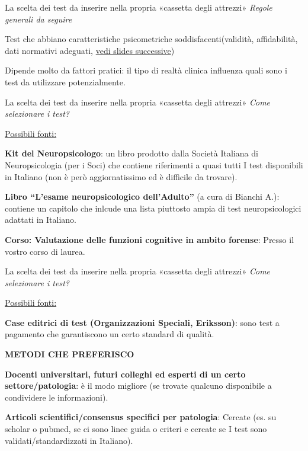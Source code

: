 \documentclass[
  ignorenonframetext,
]{beamer}
\begin{document}
\begin{frame}{La scelta dei test da inserire nella propria «cassetta
degli attrezzi»}
\label{la-scelta-dei-test-da-inserire-nella-propria-cassetta-degli-attrezzi}
\emph{Regole generali da seguire}

Test che abbiano caratteristiche psicometriche soddisfacenti(validità,
affidabilità, dati normativi adeguati,
\underline{vedi slides successive})

Dipende molto da fattori pratici: il tipo di realtà clinica influenza
quali sono i test da utilizzare potenzialmente.
\end{frame}

\begin{frame}{La scelta dei test da inserire nella propria «cassetta
degli attrezzi»}
\label{la-scelta-dei-test-da-inserire-nella-propria-cassetta-degli-attrezzi-1}
\emph{Come selezionare i test?}

\underline{Possibili fonti:}

\textbf{Kit del Neuropsicologo}: un libro prodotto dalla Società
Italiana di Neuropsicologia (per i Soci) che contiene riferimenti a
quasi tutti I test disponibili in Italiano (non è però aggiornatissimo
ed è difficile da trovare).

\textbf{Libro ``L'esame neuropsicologico dell'Adulto''} (a cura di
Bianchi A.): contiene un capitolo che inlcude una lista piuttosto ampia
di test neuropsicologici adattati in Italiano.

\textbf{Corso: Valutazione delle funzioni cognitive in ambito forense}:
Presso il vostro corso di laurea.
\end{frame}

\begin{frame}{La scelta dei test da inserire nella propria «cassetta
degli attrezzi»}
\label{la-scelta-dei-test-da-inserire-nella-propria-cassetta-degli-attrezzi-2}
\emph{Come selezionare i test?}

\underline{Possibili fonti:}

\textbf{Case editrici di test (Organizzazioni Speciali, Eriksson)}: sono
test a pagamento che garantiscono un certo standard di qualità.

\begin{center}
  \textbf{METODI CHE PREFERISCO}
\end{center}

\textbf{Docenti universitari, futuri colleghi ed esperti di un certo
settore/patologia}: è il modo migliore (se trovate qualcuno disponibile
a condividere le informazioni).

\textbf{Articoli scientifici/consensus specifici per patologia}: Cercate
(es. su scholar o pubmed, se ci sono linee guida o criteri e cercate se
I test sono validati/standardizzati in Italiano).
\end{frame}
\end{document}
